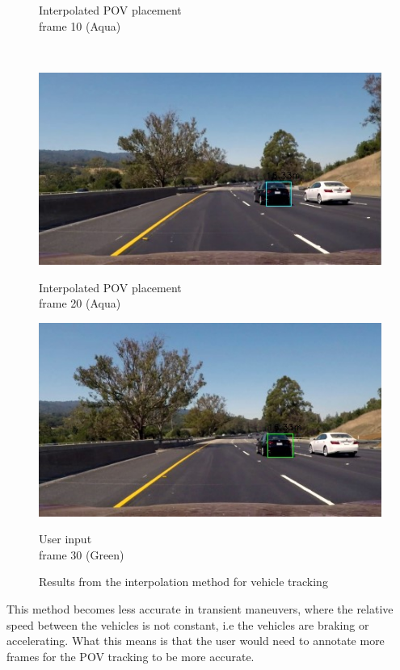 \begin{figure}[H]
\begin{minipage}[b]{0.45\linewidth}
    \caption*{Interpolated POV placement\\ frame 10 (Aqua)}
\end{minipage}
\vspace{5mm}\\
\begin{minipage}[b]{0.45\linewidth}
    \includegraphics[width=\linewidth]{Figures/interpolation_frame_20.jpg}
    \caption*{Interpolated POV placement\\ frame 20 (Aqua)}
\end{minipage}
\begin{minipage}[b]{0.45\linewidth}
    \includegraphics[width=\linewidth]{Figures/interpolation_frame_30.jpg}
    \caption*{User input\\ frame 30 (Green)}
\end{minipage}
\caption{Results from the interpolation method for vehicle tracking}
\label{fig:POV_tracking_interpolation}
\end{figure}

This method becomes less accurate in transient maneuvers, where the relative speed between the vehicles is not constant, i.e the vehicles are braking or accelerating. What this means is that the user would need to annotate more frames for the POV tracking to be more accurate. 

